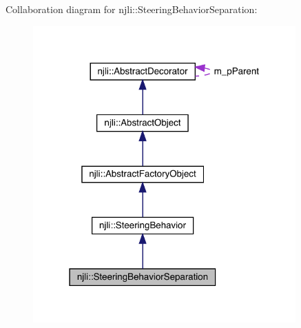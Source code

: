 Collaboration diagram for njli\+:\+:Steering\+Behavior\+Separation\+:\nopagebreak
\begin{figure}[H]
\begin{center}
\leavevmode
\includegraphics[width=286pt]{classnjli_1_1_steering_behavior_separation__coll__graph}
\end{center}
\end{figure}
